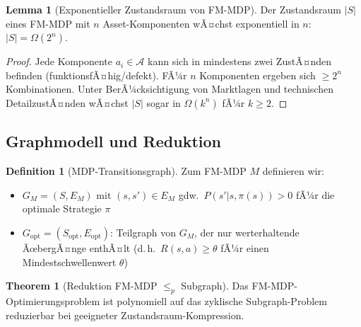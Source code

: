 ﻿\documentclass[a4paper,12pt]{article}
\theoremstyle{definition}
\newtheorem{definition}{Definition}[section]
\newtheorem{lemma}{Lemma}[section]
\newtheorem{theorem}{Theorem}[section]
\begin{document}
\begin{lemma}[Exponentieller Zustandsraum von FM-MDP]
\label{lem:mdp-exp}
Der Zustandsraum $|S|$ eines FM-MDP mit $n$ Asset-Komponenten wÃ¤chst exponentiell in $n$:
$|S| = \Omega(2^n)$.
\end{lemma}

\begin{proof}
Jede Komponente $a_i \in \mathcal{A}$ kann sich in mindestens zwei ZustÃ¤nden befinden
(funktionsfÃ¤hig/defekt). FÃ¼r $n$ Komponenten ergeben sich $\geq 2^n$ Kombinationen.
Unter BerÃ¼cksichtigung von Marktlagen und technischen DetailzustÃ¤nden wÃ¤chst $|S|$
sogar in $\Omega(k^n)$ fÃ¼r $k \geq 2$.
\end{proof}

\subsection{Graphmodell und Reduktion}

\begin{definition}[MDP-Transitionsgraph]
\label{def:mdptg}
Zum FM-MDP $M$ definieren wir:
\begin{itemize}
    \item $G_M = (S, E_M)$ mit $(s, s') \in E_M$ gdw.\ $P(s' | s, \pi(s)) > 0$
          fÃ¼r die optimale Strategie $\pi$
    \item $G_{\mathrm{opt}} = (S_{\mathrm{opt}}, E_{\mathrm{opt}})$: Teilgraph von $G_M$,
          der nur werterhaltende ÃœbergÃ¤nge enthÃ¤lt
          (d.\,h.\ $R(s, a) \geq \theta$ fÃ¼r einen Mindestschwellenwert $\theta$)
\end{itemize}
\end{definition}

\begin{theorem}[Reduktion FM-MDP $\leq_p$ Subgraph]
\label{thm:mdp-red}
Das FM-MDP-Optimierungsproblem ist polynomiell auf das zyklische Subgraph-Problem
reduzierbar bei geeigneter Zustandsraum-Kompression.
\end{theorem}
\end{document}
